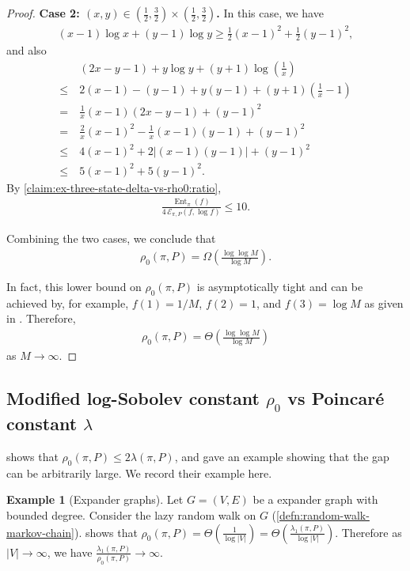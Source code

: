 \documentclass[11pt]{article}
\def\cE{\mathcal{E}}
\DeclareMathOperator\Ent{\mathrm{Ent}}
\theoremstyle{definition}
\newtheorem{example}[theorem]{Example}
\begin{document}
\begin{proof}
\textbf{Case 2: $(x,y) \in (\frac{1}{2},\frac{3}{2}) \times (\frac{1}{2},\frac{3}{2})$.}
In this case,
we have
\begin{align}
(x-1)\log x + (y-1) \log y \ge \frac{1}{2} (x-1)^2 + \frac{1}{2} (y-1)^2,
\end{align}
and also
\begin{align}
&~(2x - y - 1) + y\log y + (y+1) \log\left( \frac{1}{x} \right) \\
\nonumber \le&~2(x-1) - (y-1) + y(y-1) + (y+1) \left( \frac{1}{x}-1 \right) \\
\nonumber =&~\frac{1}{x} (x-1)\left( 2x - y-1 \right) + (y-1)^2 \\
\nonumber =&~\frac{2}{x}(x-1)^2 - \frac{1}{x}(x-1)(y-1) + (y-1)^2 \\
\nonumber \le&~4(x-1)^2 + 2|(x-1)(y-1)| + (y-1)^2 \\
\nonumber \le&~5(x-1)^2 + 5(y-1)^2.
\end{align}
By \cref{claim:ex-three-state-delta-vs-rho0:ratio},
\begin{align}
\frac{\Ent_\pi(f)}{4\, \cE_{\pi,P}(f,\log f)} \le 10.
\end{align}

Combining the two cases, we conclude that
\begin{align} \label{eqn:three-state-rho0-lower-bound}
  \rho_0(\pi, P) = \Omega\left( \frac{\log \log M} {\log M}\right).
\end{align}

In fact, this lower bound on $\rho_0(\pi, P)$ is asymptotically tight and can be achieved by, for example, $f(1)=1/M$, $f(2)=1$, and $f(3)=\log M$ as given in \cite{Mun23}.
Therefore,
\begin{align}
  \rho_0(\pi, P) = \Theta\left( \frac{\log\log M}{\log M} \right)
\end{align}
as $M\to \infty$.

\end{proof}


\subsection{Modified log-Sobolev constant \texorpdfstring{$\rho_0$}{rho0} vs Poincar\'e constant \texorpdfstring{$\lambda$}{lambda}} \label{sec:comparison:rho0-vs-lambda}
\cite{bobkov2006modified} shows that $\rho_0(\pi, P) \le 2\lambda(\pi, P)$, and gave an example showing that the gap can be arbitrarily large. We record their example here.
\begin{example}[Expander graphs] \label{ex:expander}
  Let $G=(V,E)$ be a expander graph with bounded degree.
  Consider the lazy random walk on $G$ (\cref{defn:random-walk-markov-chain}).
  \cite{bobkov2006modified} shows that $\rho_0(\pi, P) = \Theta\left(\frac 1{\log |V|}\right) = \Theta\left(\frac{\lambda_1(\pi, P)}{\log |V|}\right)$.
  Therefore as $|V|\to \infty$, we have $\frac{\lambda_1(\pi, P)}{\rho_0(\pi, P)} \to \infty$.
\end{example}
\end{document}
